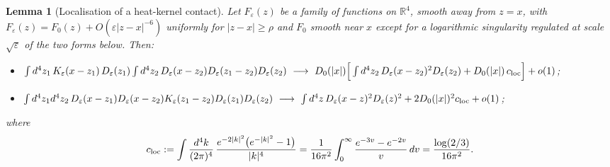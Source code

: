 \documentclass[11pt]{article}
\theoremstyle{plain}
\newtheorem{lemma}[theorem]{Lemma}
\theoremstyle{definition}
\numberwithin{equation}{section}
\begin{document}
\begin{lemma}[Localisation of a heat-kernel contact]
\label{lem:local}
Let $F_\varepsilon(z)$ be a family of functions on $\mathbb R^4$, smooth away from $z=x$, with $F_\varepsilon(z)=F_0(z)+O(\varepsilon|z-x|^{-6})$ uniformly for $|z-x|\ge\rho$ and $F_0$ smooth near $x$ except for a logarithmic singularity regulated at scale $\sqrt\varepsilon$ of the two forms below. Then:
\begin{itemize}
\item[(i)] $\int d^4z_1\,K_\varepsilon(x-z_1)\,D_\varepsilon(z_1)\int d^4z_2\,D_\varepsilon(x-z_2)D_\varepsilon(z_1-z_2)D_\varepsilon(z_2)\ \longrightarrow\ D_0(|x|)\Big[\int d^4z_2\,D_\varepsilon(x-z_2)^2D_\varepsilon(z_2)+D_0(|x|)\,c_{\rm loc}\Big]+o(1)$;
\item[(ii)] $\int d^4z_1d^4z_2\,D_\varepsilon(x-z_1)D_\varepsilon(x-z_2)K_\varepsilon(z_1-z_2)D_\varepsilon(z_1)D_\varepsilon(z_2)\ \longrightarrow\ \int d^4z\,D_\varepsilon(x-z)^2D_\varepsilon(z)^2+2D_0(|x|)^2c_{\rm loc}+o(1)$;
\end{itemize}
where
\[
c_{\rm loc}:=\int\frac{d^4k}{(2\pi)^4}\,\frac{e^{-2|k|^2}\big(e^{-|k|^2}-1\big)}{|k|^4}=\frac{1}{16\pi^2}\int_0^\infty\frac{e^{-3v}-e^{-2v}}{v}\,dv=\frac{\log(2/3)}{16\pi^2}.
\]
\end{lemma}
\end{document}
